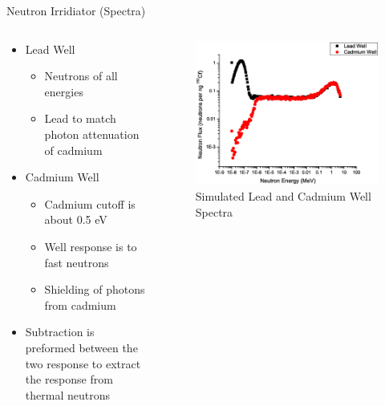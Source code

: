 \begin{frame}{Neutron Irridiator (Spectra)}
\begin{columns}[onlytextwidth]
\begin{column}{0.45\textwidth}
	\begin{itemize}
		\small
		\item Lead Well
		\begin{itemize}
			\tiny
			\item Neutrons of all energies
			\item Lead to match photon attenuation of cadmium
		\end{itemize}
		\small
		\item Cadmium Well
		\begin{itemize}
			\tiny
			\item Cadmium cutoff is about 0.5 eV
			\item Well response is to fast neutrons
			\item Shielding of photons from cadmium
		\end{itemize}
		\small 
		\item Subtraction is preformed between the two response to extract the response from thermal neutrons
	\end{itemize}
\end{column}
\begin{column}{0.45\textwidth}
	\begin{figure}
		\centering
		\includegraphics[height=\textwidth]{images/Graph19N.eps}
		\caption{Simulated Lead and Cadmium Well Spectra}
		\label{fig:SimPbCdSpectra}
	\end{figure}
\end{column}
\end{columns}
\end{frame}
